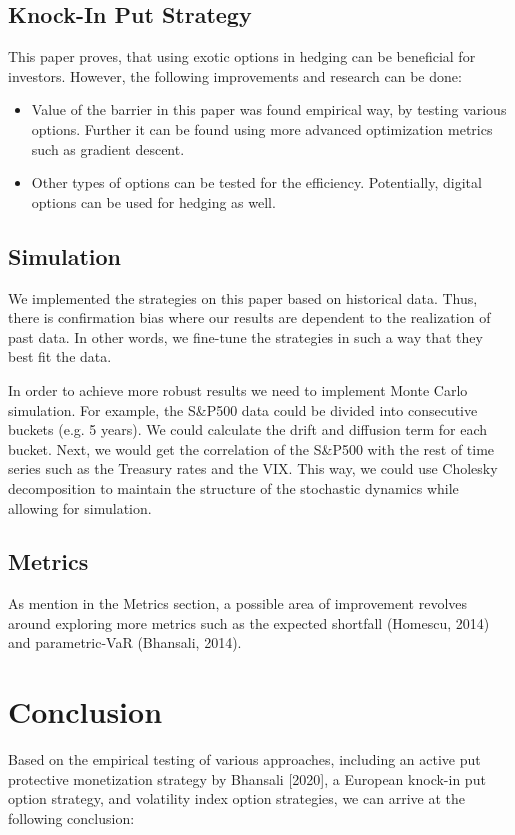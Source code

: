 \documentclass[12pt]{article}
\begin{document}
{{\subsection{Knock-In Put Strategy}
\qquad This paper proves, that using exotic options in hedging can be beneficial for investors. However, the following improvements and research can be done:
\begin{itemize}
\item Value of the barrier in this paper was found empirical way, by testing various options. Further it can be found using more advanced optimization metrics such as gradient descent.
\item Other types of options can be tested for the efficiency. Potentially, digital options can be used for hedging as well. 
\end{itemize}

\subsection{Simulation}
We implemented the strategies on this paper based on historical data. Thus, there is confirmation bias where our results are dependent to the realization of past data. In other words, we fine-tune the strategies in such a way that they best fit the data. 

In order to achieve more robust results we need to implement Monte Carlo simulation. For example, the S\&P500 data could be divided into consecutive buckets (e.g. 5 years). We could calculate the drift and diffusion term for each bucket. Next, we would get the correlation of the S\&P500 with the rest of time series such as the Treasury rates and the VIX. This way, we could use Cholesky decomposition to maintain the structure of the stochastic dynamics while allowing for simulation.  

\subsection{Metrics}
As mention in the Metrics section, a possible area of improvement revolves around exploring more metrics such as the expected shortfall (Homescu, 2014) and parametric-VaR (Bhansali, 2014).

\section{Conclusion}

\qquad Based on the empirical testing of various approaches, including an active put protective monetization strategy by Bhansali [2020], a European knock-in put option strategy, and volatility index option strategies, we can arrive at the following  conclusion:

}}
\end{document}
